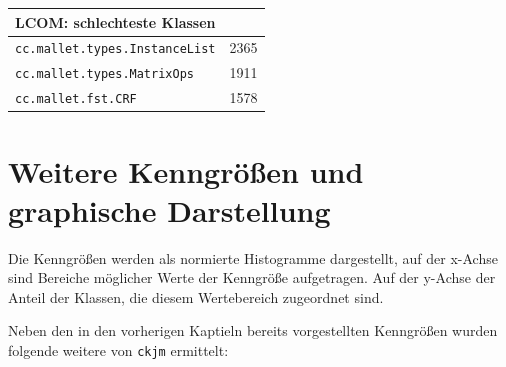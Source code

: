 \documentclass{scrreprt}
\newcommand{\lstx}[1]{\lstinline$#1$}
\begin{document}
\begin{center}
\begin{tabular}{ll}
\toprule
LCOM: schlechteste Klassen \\
\midrule
\lstx{cc.mallet.types.InstanceList} & 2365\\
\lstx{cc.mallet.types.MatrixOps} & 1911\\
\lstx{cc.mallet.fst.CRF} & 1578 \\
\bottomrule
\end{tabular}
\end{center}


\section{Weitere Kenngrößen und graphische Darstellung}


Die Kenngrößen werden als normierte Histogramme dargestellt, auf der x-Achse sind Bereiche möglicher Werte der Kenngröße aufgetragen. Auf der y-Achse der Anteil der Klassen, die diesem Wertebereich zugeordnet sind.

Neben den in den vorherigen Kaptieln bereits vorgestellten Kenngrößen wurden folgende weitere von \lstx{ckjm} ermittelt:
\end{document}
